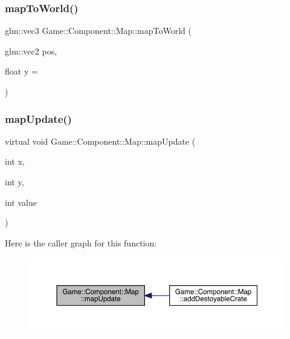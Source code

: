 \subsubsection{\texorpdfstring{map\+To\+World()}{mapToWorld()}}
{\footnotesize\ttfamily glm\+::vec3 Game\+::\+Component\+::\+Map\+::map\+To\+World (\begin{DoxyParamCaption}\item[{glm\+::vec2}]{pos,  }\item[{float}]{y = {} }\end{DoxyParamCaption})}

\mbox{\label{class_game_1_1_component_1_1_map_ae1900809e3369230a8dd3678a397ba98}} 
\subsubsection{\texorpdfstring{map\+Update()}{mapUpdate()}\hspace{0.1cm}{\footnotesize\ttfamily [1/2]}}
{\footnotesize\ttfamily virtual void Game\+::\+Component\+::\+Map\+::map\+Update (\begin{DoxyParamCaption}\item[{int}]{x,  }\item[{int}]{y,  }\item[{int}]{value }\end{DoxyParamCaption})\hspace{0.3cm}{\ttfamily [virtual]}}

Here is the caller graph for this function\+:\nopagebreak
\begin{figure}[H]
\begin{center}
\leavevmode
\includegraphics[width=350pt]{class_game_1_1_component_1_1_map_ae1900809e3369230a8dd3678a397ba98_icgraph}
\end{center}
\end{figure}
\mbox{\label{class_game_1_1_component_1_1_map_aa62669035c53c17e1a7b680d28514575}} 
